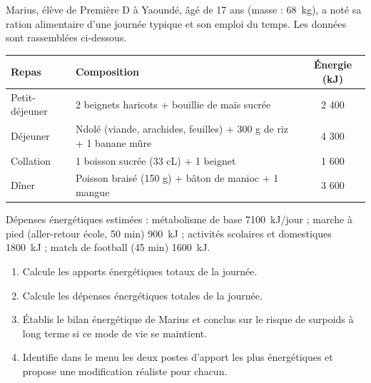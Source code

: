 \documentclass[11pt]{article}
\newcounter{popsec}
\newcounter{popsub}
\newcommand{\courssub}[1]{%
  \stepcounter{popsub}%
  \par\vspace{9pt}\noindent{\popxbold\fontsize{11.5}{13}\selectfont\color{popink}{\color{poporange}\thepopsec.\thepopsub}\hspace{6pt}#1}\par\nopagebreak\vspace{4pt}
}
\begin{document}
\courssub{Je m'entraîne}

\begin{exercice}
Marius, élève de Première D à Yaoundé, âgé de 17 ans (masse : \SI{68}{kg}), a noté sa ration alimentaire d'une journée typique et son emploi du temps. Les données sont rassemblées ci-dessous.

\begin{center}
\begin{tabularx}{\linewidth}{|l|X|c|}
\hline
\rowcolor{popblue!40} \textbf{Repas} & \textbf{Composition} & \textbf{Énergie (kJ)} \\
\hline
Petit-déjeuner & 2 beignets haricots + bouillie de maïs sucrée & 2 400 \\
\hline
Déjeuner & Ndolé (viande, arachides, feuilles) + 300 g de riz + 1 banane mûre & 4 300 \\
\hline
Collation & 1 boisson sucrée (33 cL) + 1 beignet & 1 600 \\
\hline
Dîner & Poisson braisé (150 g) + bâton de manioc + 1 mangue & 3 600 \\
\hline
\end{tabularx}
\end{center}

Dépenses énergétiques estimées : métabolisme de base \SI{7100}{kJ/jour} ; marche à pied (aller-retour école, 50 min) \SI{900}{kJ} ; activités scolaires et domestiques \SI{1800}{kJ} ; match de football (45 min) \SI{1600}{kJ}.

\begin{enumerate}
\item Calcule les apports énergétiques totaux de la journée.
\item Calcule les dépenses énergétiques totales de la journée.
\item Établis le bilan énergétique de Marius et conclus sur le risque de surpoids à long terme si ce mode de vie se maintient.
\item Identifie dans le menu les deux postes d'apport les plus énergétiques et propose une modification réaliste pour chacun.
\end{enumerate}
\end{exercice}
\end{document}
